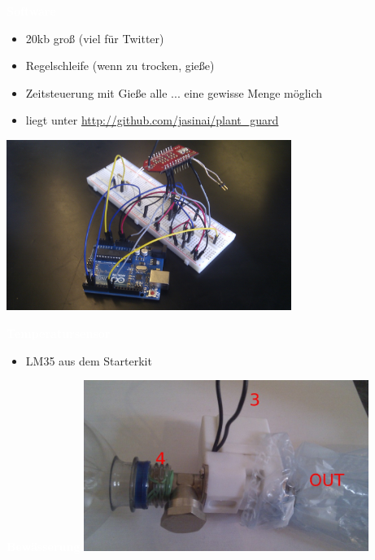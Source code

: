 \documentclass[bigger]{beamer}
\newcommand{\topic}[1]{{\huge{\textcolor{white}{\textbf{#1}}}}}
\begin{document}
\begin{frame}{\topic{Software}}
	\begin{itemize}
		\item 20kb groß (viel für Twitter)
		\item Regelschleife (wenn zu trocken, gieße)
		\item Zeitsteuerung mit Gieße alle ... eine gewisse Menge möglich
		\item liegt unter \url{http://github.com/jasinai/plant\_guard}
	\end{itemize}
\end{frame}



\begin{frame}
\includegraphics[width=350px]{board.jpg}
\end{frame}
\begin{frame}{\topic{Temperatursensor}}
	\begin{itemize}
		\item LM35 aus dem Starterkit
	\end{itemize}
\end{frame}

\begin{frame}{\topic{Bewässerung}}
       \includegraphics[width=350px]{Anschluss.jpg}
\end{frame}
\end{document}

